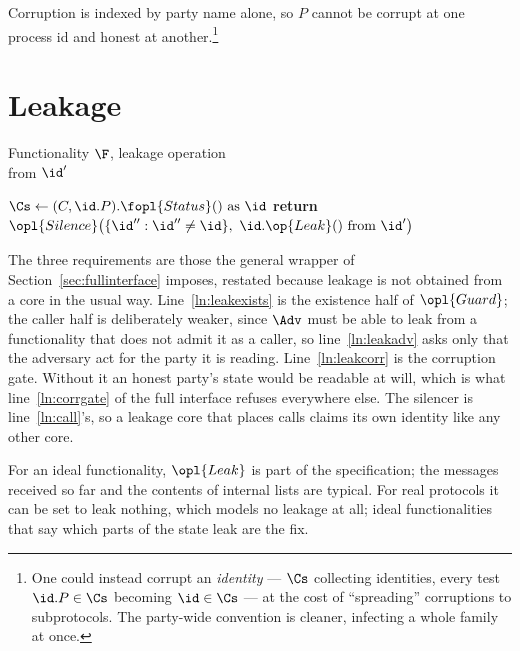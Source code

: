 \documentclass[10pt,oneside,openany]{book}
\theoremstyle{accentdef}
\theoremstyle{accentplain}
\begin{document}
Corruption is indexed by party name alone, so $P$ cannot be corrupt at one process id and honest
at another.\footnote{One could instead corrupt an \emph{identity} --- $\Cs$ collecting
identities, every test $\id.P \in \Cs$ becoming $\id \in \Cs$ --- at the cost of ``spreading''
corruptions to subprotocols. The party-wide convention is cleaner, infecting a whole family at
once.}
\section{Leakage}\label{sec:leakage}

\begin{interface}{Functionality $\F$, leakage operation \\
\params{$\PID$, \quad $\Ps$, \quad $\admits$, \quad $\uses$, \quad $\pars$}}
 \quad from $\id'$
\begin{algorithmic}[1]
 \label{ln:leakexists}
 \label{ln:leakadv}
\State $\Cs \gets (C,\id.P).\fopl{Status}() \text{ as } \id$
 \label{ln:leakcorr}
\State \textbf{return} $\opl{Silence}\bigl(\{\id'' : \id'' \ne \id \},\ \id.\op{Leak}() \text{ from } \id'\bigr)$
\end{algorithmic}
\end{interface}

The three requirements are those the general wrapper of Section~\ref{sec:fullinterface} imposes,
restated because leakage is not obtained from a core in the usual way.
Line~\ref{ln:leakexists} is the existence half of $\opl{Guard}$; the caller half is deliberately
weaker, since $\Adv$ must be able to leak from a functionality that does not admit it as a caller,
so line~\ref{ln:leakadv} asks only that the adversary act for the party it is reading.
Line~\ref{ln:leakcorr} is the corruption gate. Without it an honest party's state would be
readable at will, which is what line~\ref{ln:corrgate} of the full interface refuses everywhere
else. The silencer is line~\ref{ln:call}'s, so a leakage core that places calls claims its own
identity like any other core.

For an ideal functionality, $\opl{Leak}$ is part of the specification; the messages received so
far and the contents of internal lists are typical. For real protocols it can be set to leak
nothing, which models no leakage at all; ideal functionalities that say which parts of the state
leak are the fix.
\end{document}
